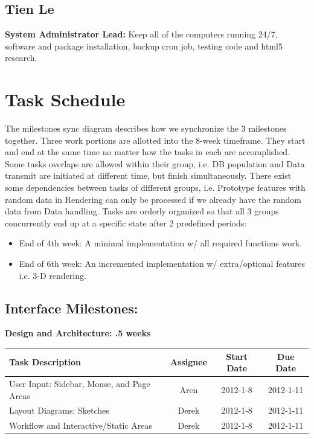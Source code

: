 \documentclass[12pt, letterpaper]{article}
\begin{document}
  \subsection{Tien Le}
  {\bf System Administrator Lead:} Keep all of the computers running 24/7, software and package installation, backup cron job, testing code and html5 research. 

\section{Task Schedule}

The milestones sync diagram describes how we synchronize the 3 milestones together. Three work portions are allotted into the 8-week timeframe. They start and end at the same time no matter how the tasks in each are accomplished. Some tasks overlaps are allowed within their group, i.e. DB population and Data transmit are initiated at different time, but finish simultaneously. There exist some dependencies between tasks of different groups, i.e. Prototype features with random data in Rendering can only be processed if we already have the random data from Data handling. Tasks are orderly organized so that all 3 groups concurrently end up at a specific state after 2 predefined periods:
  \begin{itemize}
    \item End of 4th week:  A minimal implementation w/ all required functions work.
    \item End of 6th week: An incremented implementation w/ extra/optional features i.e. 3-D rendering.
  \end{itemize}
  \subsection{Interface Milestones:}
	
  \begin{center}
		{\bf Design and Architecture: .5 weeks}
    \begin{tabular}{| p{8.3cm} || c | c | c | }
      \hline
      Task Description & Assignee & Start Date & Due Date \\
      \hline
	    User Input: Sidebar, Mouse, and Page Areas & Aren & 2012-1-8 & 2012-1-11 \\
	    Layout Diagrams: Sketches & Derek & 2012-1-8 & 2012-1-11 \\
	    Workflow and Interactive/Static Areas & Derek & 2012-1-8 & 2012-1-11 \\
      \hline
    \end{tabular}
  \end{center}
\end{document}
